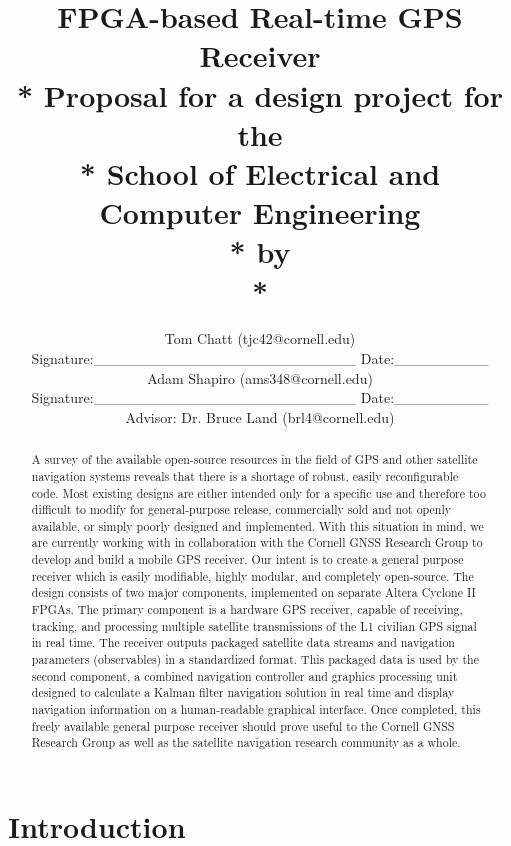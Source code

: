 \documentclass[14pt]{article}
\title{\textbf{{\LARGE{FPGA-based Real-time GPS Receiver}}}
\\*
\vspace{4.5 cm}
Proposal for a design project for the 
\\*
School of Electrical and Computer Engineering
\\*
\vspace{4.5 cm}
by
\\*
\vspace{4.5 cm}
}
\author{
Tom Chatt (tjc42@cornell.edu)
\vspace{0.2 cm}
\\
Signature:\_\_\_\_\_\_\_\_\_\_\_\_\_\_\_\_\_\_\_\_\_\_\_\_\_  Date:\_\_\_\_\_\_\_\_\_
\vspace{0.5 cm}
\\
Adam Shapiro (ams348@cornell.edu) 
\vspace{0.2 cm}
\\
Signature:\_\_\_\_\_\_\_\_\_\_\_\_\_\_\_\_\_\_\_\_\_\_\_\_\_  Date:\_\_\_\_\_\_\_\_\_
\vspace{0.5 cm}
\\
Advisor: Dr. Bruce Land (brl4@cornell.edu)
}
\date{}
\begin{document}
\maketitle
\thispagestyle{empty}

\begin{abstract}
A survey of the available open-source resources in the field of GPS and other satellite navigation 
systems reveals that there is a shortage of robust, easily reconfigurable code.  Most existing 
designs are either intended only for a specific use and therefore too difficult to modify for general-purpose 
release, commercially sold and not openly available, or simply poorly designed and implemented.  
With this situation in mind, we are currently working with in collaboration with the Cornell GNSS 
Research Group to develop and build 
a mobile GPS receiver.  Our intent is to create a general purpose receiver which is easily modifiable, 
highly modular, and completely open-source.  The design consists of two major components, 
implemented on separate Altera Cyclone II FPGAs.  The primary component is a hardware GPS receiver, 
capable of receiving, tracking, and processing multiple satellite transmissions of the L1 civilian GPS
signal in real time.  The receiver outputs packaged satellite data streams and navigation parameters
(observables) in a standardized format.  This packaged data is used by the second component, a
combined navigation controller and graphics processing unit designed to calculate a Kalman filter
navigation solution in real time and display navigation information on a human-readable graphical
interface.  Once completed, this freely available general purpose receiver should prove useful to 
the Cornell GNSS Research Group as well as the satellite navigation research community as a whole.
\end{abstract}

\section*{Introduction}
\end{document}
